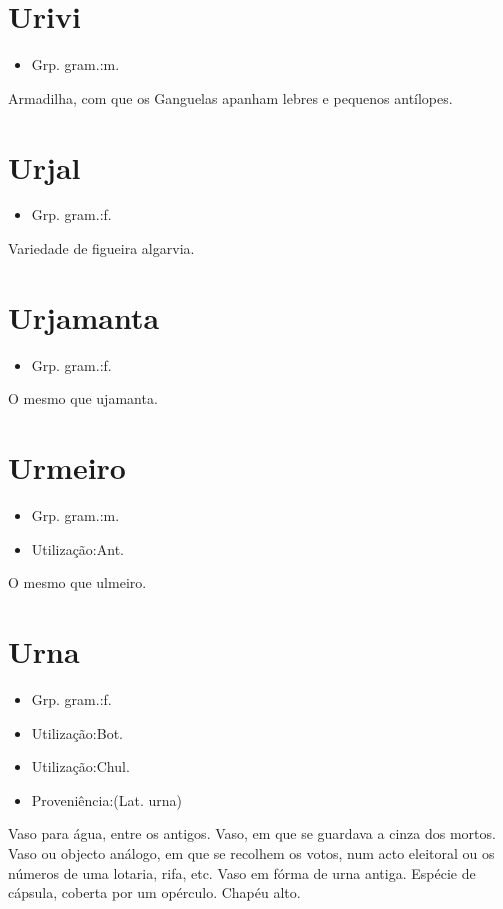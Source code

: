 \documentclass{article}
\begin{document}
\section{Urivi}
\begin{itemize}
\item {Grp. gram.:m.}
\end{itemize}
Armadilha, com que os Ganguelas apanham lebres e pequenos antílopes.
\section{Urjal}
\begin{itemize}
\item {Grp. gram.:f.}
\end{itemize}
Variedade de figueira algarvia.
\section{Urjamanta}
\begin{itemize}
\item {Grp. gram.:f.}
\end{itemize}
O mesmo que \textunderscore ujamanta\textunderscore .
\section{Urmeiro}
\begin{itemize}
\item {Grp. gram.:m.}
\end{itemize}
\begin{itemize}
\item {Utilização:Ant.}
\end{itemize}
O mesmo que \textunderscore ulmeiro\textunderscore .
\section{Urna}
\begin{itemize}
\item {Grp. gram.:f.}
\end{itemize}
\begin{itemize}
\item {Utilização:Bot.}
\end{itemize}
\begin{itemize}
\item {Utilização:Chul.}
\end{itemize}
\begin{itemize}
\item {Proveniência:(Lat. \textunderscore urna\textunderscore )}
\end{itemize}
Vaso para água, entre os antigos.
Vaso, em que se guardava a cinza dos mortos.
Vaso ou objecto análogo, em que se recolhem os votos, num acto eleitoral ou os números de uma lotaria, rifa, etc.
Vaso em fórma de urna antiga.
Espécie de cápsula, coberta por um opérculo.
Chapéu alto.
\end{document}
